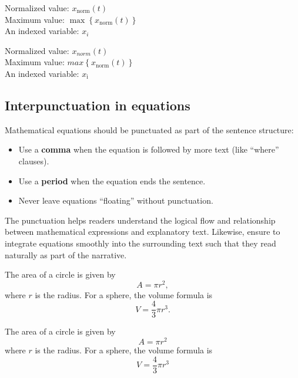 \begin{successbox}
Normalized value: $x_\mathrm{norm}(t)$ \\
Maximum value: $\max\left\{x_\mathrm{norm}(t)\right\}$ \\
An indexed variable: $x_i$
\end{successbox}%

\begin{errorbox}
Normalized value: $x_{norm}(t)$ \\
Maximum value: $max \left\{x_{\mathrm{norm}}(t) \right\}$\\
An indexed variable: $x_{\mathrm{i}}$
\end{errorbox}



\subsection{Interpunctuation in equations}
\label{subsec:interpunctuation}
\begin{infobox}
Mathematical equations should be punctuated as part of the sentence structure:

\begin{itemize}
\item Use a \textbf{comma} when the equation is followed by more text (like \enquote{where} clauses).
\item Use a \textbf{period} when the equation ends the sentence.
\item Never leave equations \enquote{floating} without punctuation.
\end{itemize}

The punctuation helps readers understand the logical flow and relationship between mathematical expressions and explanatory text. Likewise, ensure to integrate equations smoothly into the surrounding text such that they read naturally as part of the narrative.
\end{infobox}
%
\begin{successbox}
The area of a circle is given by
\begin{equation}
A = \pi r^2,
\end{equation}
where $r$ is the radius. For a sphere, the volume formula is
\begin{equation}
V = \frac{4}{3}\pi r^3.
\end{equation}
\end{successbox}
%
\begin{errorbox}
The area of a circle is given by
\begin{equation}
A = \pi r^2
\end{equation}
where $r$ is the radius. For a sphere, the volume formula is
\begin{equation}
V = \frac{4}{3}\pi r^3
\end{equation}
\end{errorbox}

